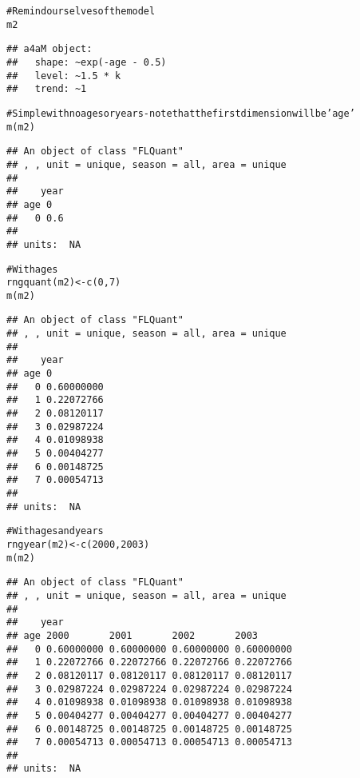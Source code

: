 \documentclass[a4paper,english,10pt]{article}\usepackage[]{graphicx}\usepackage[]{color}
\makeatletter
\newcommand{\hlnum}[1]{\textcolor[rgb]{0.2,0.2,0.2}{#1}}%
\newcommand{\hlcom}[1]{\textcolor[rgb]{0.2,0.267,0.4}{#1}}%
\newcommand{\hlstd}[1]{\textcolor[rgb]{0,0,0}{#1}}%
\newcommand{\hlkwb}[1]{\textcolor[rgb]{0.361,0.506,0.596}{#1}}%
\newcommand{\hlkwd}[1]{\textcolor[rgb]{0.361,0.506,0.596}{#1}}%
\newenvironment{kframe}{%
 \def\at@end@of@kframe{}%
 \ifinner\ifhmode%
  \def\at@end@of@kframe{\end{minipage}}%
  \begin{minipage}{\columnwidth}%
 \fi\fi%
 \def\FrameCommand##1{\hskip\@totalleftmargin \hskip-\fboxsep
 \colorbox{shadecolor}{##1}\hskip-\fboxsep
     \hskip-\linewidth \hskip-\@totalleftmargin \hskip\columnwidth}%
 \MakeFramed {\advance\hsize-\width
   \@totalleftmargin\z@ \linewidth\hsize
   \@setminipage}}%
 {\par\unskip\endMakeFramed%
 \at@end@of@kframe}
\newenvironment{knitrout}{}{} %
\makeatother
\begin{document}
\begin{knitrout}
\color{fgcolor}\begin{kframe}
\begin{alltt}
\hlcom{# Remind ourselves of the model}
\hlstd{m2}
\end{alltt}
\begin{verbatim}
## a4aM object:
##   shape: ~exp(-age - 0.5)
##   level: ~1.5 * k
##   trend: ~1
\end{verbatim}
\begin{alltt}
\hlcom{# Simple with no ages or years - note that the first dimension will be 'age'}
\hlkwd{m}\hlstd{(m2)}
\end{alltt}
\begin{verbatim}
## An object of class "FLQuant"
## , , unit = unique, season = all, area = unique
## 
##    year
## age 0  
##   0 0.6
## 
## units:  NA
\end{verbatim}
\begin{alltt}
\hlcom{# With ages}
\hlkwd{rngquant}\hlstd{(m2)} \hlkwb{<-} \hlkwd{c}\hlstd{(}\hlnum{0}\hlstd{,}\hlnum{7}\hlstd{)}
\hlkwd{m}\hlstd{(m2)}
\end{alltt}
\begin{verbatim}
## An object of class "FLQuant"
## , , unit = unique, season = all, area = unique
## 
##    year
## age 0         
##   0 0.60000000
##   1 0.22072766
##   2 0.08120117
##   3 0.02987224
##   4 0.01098938
##   5 0.00404277
##   6 0.00148725
##   7 0.00054713
## 
## units:  NA
\end{verbatim}
\begin{alltt}
\hlcom{# With ages and years}
\hlkwd{rngyear}\hlstd{(m2)} \hlkwb{<-} \hlkwd{c}\hlstd{(}\hlnum{2000}\hlstd{,} \hlnum{2003}\hlstd{)}
\hlkwd{m}\hlstd{(m2)}
\end{alltt}
\begin{verbatim}
## An object of class "FLQuant"
## , , unit = unique, season = all, area = unique
## 
##    year
## age 2000       2001       2002       2003      
##   0 0.60000000 0.60000000 0.60000000 0.60000000
##   1 0.22072766 0.22072766 0.22072766 0.22072766
##   2 0.08120117 0.08120117 0.08120117 0.08120117
##   3 0.02987224 0.02987224 0.02987224 0.02987224
##   4 0.01098938 0.01098938 0.01098938 0.01098938
##   5 0.00404277 0.00404277 0.00404277 0.00404277
##   6 0.00148725 0.00148725 0.00148725 0.00148725
##   7 0.00054713 0.00054713 0.00054713 0.00054713
## 
## units:  NA
\end{verbatim}
\begin{alltt}

\end{alltt}
\end{kframe}
\end{knitrout}
\end{document}
